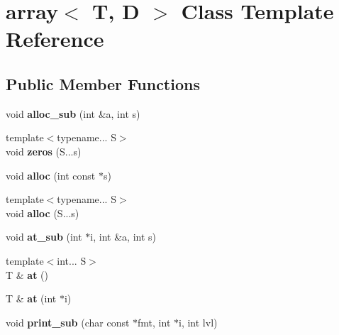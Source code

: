 \hypertarget{classarray}{
\section{array$<$ T, D $>$ Class Template Reference}
\label{classarray}
}
\subsection*{Public Member Functions}
\begin{DoxyCompactItemize}
\item 
\hypertarget{classarray_ab3491a5460b213451b0837fe7d417946}{
void {\bfseries alloc\_\-sub} (int \&a, int s)}
\label{classarray_ab3491a5460b213451b0837fe7d417946}

\item 
\hypertarget{classarray_ae3794543c52e3063061923099264a441}{
{\footnotesize template$<$typename... S$>$ }\\void {\bfseries zeros} (S...s)}
\label{classarray_ae3794543c52e3063061923099264a441}

\item 
\hypertarget{classarray_a155d85b8477bedf8379e29288f96bb12}{
void {\bfseries alloc} (int const $\ast$s)}
\label{classarray_a155d85b8477bedf8379e29288f96bb12}

\item 
\hypertarget{classarray_a7da487ddfe99bc1cdcd26eff9efc2013}{
{\footnotesize template$<$typename... S$>$ }\\void {\bfseries alloc} (S...s)}
\label{classarray_a7da487ddfe99bc1cdcd26eff9efc2013}

\item 
\hypertarget{classarray_a6edd94a7b183b1c219e0fdccf54af80f}{
void {\bfseries at\_\-sub} (int $\ast$i, int \&a, int s)}
\label{classarray_a6edd94a7b183b1c219e0fdccf54af80f}

\item 
\hypertarget{classarray_a55da36dbe002fd18f88b64bf6f6f14e8}{
{\footnotesize template$<$int... S$>$ }\\T \& {\bfseries at} ()}
\label{classarray_a55da36dbe002fd18f88b64bf6f6f14e8}

\item 
\hypertarget{classarray_a217bd29d6caea27260c4ee44afec94d0}{
T \& {\bfseries at} (int $\ast$i)}
\label{classarray_a217bd29d6caea27260c4ee44afec94d0}

\item 
\hypertarget{classarray_af7085f3c6bc7aa77f4c69dc106f20f03}{
void {\bfseries print\_\-sub} (char const $\ast$fmt, int $\ast$i, int lvl)}
\label{classarray_af7085f3c6bc7aa77f4c69dc106f20f03}


\end{DoxyCompactItemize}
